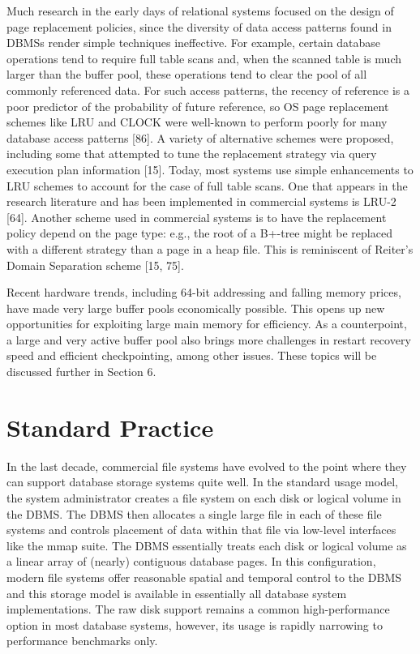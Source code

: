 \documentclass[a4paper,11pt,twoside,openright]{book}
\begin{document}
Much research in the early days of relational systems focused on the
design of page replacement policies, since the diversity of data access
patterns found in DBMSs render simple techniques ineffective. For
example, certain database operations tend to require full table scans
and, when the scanned table is much larger than the buffer pool, these
operations tend to clear the pool of all commonly referenced data. For
such access patterns, the recency of reference is a poor predictor of
the probability of future reference, so OS page replacement schemes like
LRU and CLOCK were well-known to perform poorly for many database access
patterns {[}86{]}. A variety of alternative schemes were proposed,
including some that attempted to tune the replacement strategy via query
execution plan information {[}15{]}. Today, most systems use simple
enhancements to LRU schemes to account for the case of full table scans.
One that appears in the research literature and has been implemented in
commercial systems is LRU-2 {[}64{]}. Another scheme used in commercial
systems is to have the replacement policy depend on the page type: e.g.,
the root of a B+-tree might be replaced with a different strategy than a
page in a heap file. This is reminiscent of Reiter's Domain Separation
scheme {[}15, 75{]}.

Recent hardware trends, including 64-bit addressing and falling memory
prices, have made very large buffer pools economically possible. This
opens up new opportunities for exploiting large main memory for
efficiency. As a counterpoint, a large and very active buffer pool also
brings more challenges in restart recovery speed and efficient
checkpointing, among other issues. These topics will be discussed
further in Section 6.

\hypertarget{standard-practice-3}{%
\section{Standard Practice}\label{standard-practice-3}}

In the last decade, commercial file systems have evolved to the point
where they can support database storage systems quite well. In the
standard usage model, the system administrator creates a file system on
each disk or logical volume in the DBMS. The DBMS then allocates a
single large file in each of these file systems and controls placement
of data within that file via low-level interfaces like the mmap suite.
The DBMS essentially treats each disk or logical volume as a linear
array of (nearly) contiguous database pages. In this configuration,
modern file systems offer reasonable spatial and temporal control to the
DBMS and this storage model is available in essentially all database
system implementations. The raw disk support remains a common
high-performance option in most database systems, however, its usage is
rapidly narrowing to performance benchmarks only.
\end{document}
